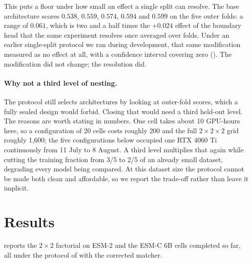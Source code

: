\documentclass{article}
\begin{document}
This puts a floor under how small an effect a single split can resolve. The base architecture scores $0.538$, $0.559$, $0.574$, $0.594$ and $0.599$ on the five outer folds: a range of $0.061$, which is two and a half times the $+0.024$ effect of the boundary head that the same experiment resolves once averaged over folds. Under an earlier single-split protocol we ran during development, that same modification measured as no effect at all, with a confidence interval covering zero (). The modification did not change; the resolution did.

\paragraph{Why not a third level of nesting.} The protocol still selects architectures by looking at outer-fold scores, which a fully sealed design would forbid. Closing that would need a third held-out level. The reasons are worth stating in numbers. One cell takes about 10 GPU-hours here, so a configuration of 20 cells costs roughly 200 and the full $2\times2\times2$ grid roughly 1{,}600; the five configurations below occupied one RTX 4060 Ti continuously from 11 July to 8 August. A third level multiplies that again while cutting the training fraction from 3/5 to 2/5 of an already small dataset, degrading every model being compared. At this dataset size the protocol cannot be made both clean and affordable, so we report the trade-off rather than leave it implicit.

\section{Results}
\label{sec:results}

 reports the $2\times2$ factorial on ESM-2 and the ESM-C 6B cells completed so far, all under the protocol of  with the corrected matcher.
\end{document}
